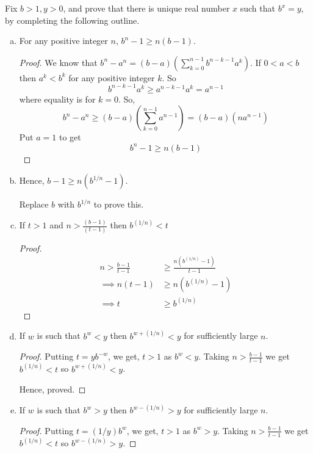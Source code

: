 \begin{prblm}
    Fix $b > 1, y > 0$, and prove that there is unique real number $x$ such that $b^x = y$, 
    by completing the following outline.
    \begin{enumerate}[(a)]
        \item For any positive integer $n$, $b^n - 1 \geq n(b-1)$.
        \begin{proof}
            We know that $b^n - a^n = (b - a)( \sum_{k=0}^{n-1} b^{n-k-1} a^k)$.
            If $0 < a < b$ then $a^k < b^k$ for any positive integer $k$. So $$b^{n-k-1}a^k \geq a^{n-k-1}a^k = a^{n-1}$$ where equality is for $k = 0$.
            So, $$ b^n - a^n \geq (b-a) \left( \sum_{k=0}^{n-1} a^{n-1} \right) = (b-a)(n a^{n-1})$$
            Put $a = 1$ to get $$ b^n - 1 \geq n(b-1) $$

        \end{proof}

        \item Hence, $b - 1 \geq n(b^{1/n} - 1)$.
        
        Replace $b$ with $b^{1/n}$ to prove this.

        \item If $t > 1$ and $n > \frac{(b-1)}{(t-1)}$ then $b^{(1/n)} < t$
        
        \begin{proof}
            \begin{align*}
                n > \frac{b-1}{t-1} & \geq \frac{n(b^{(1/n)} - 1)}{t-1} \\
                \implies n(t - 1) & \geq n(b^{(1/n)} - 1) \\
                \implies t & \geq b^{(1/n)} 
            \end{align*}
        \end{proof}

        \item If $w$ is such that $b^w < y$ then $b^{w + (1/n)} < y$ for sufficiently large $n$.
        \begin{proof}
            Putting $t = y b^{-w}$, we get, $t > 1$ as $b^w < y$. 
            Taking $n > \frac{b-1}{t-1}$ we get $b^{(1/n)} < t$ so $b^{w + (1/n)} < y$.
            
            Hence, proved.
        \end{proof}


        \item If $w$ is such that $b^w > y$ then $b^{w - (1/n)} > y$ for sufficiently large $n$.
        \begin{proof}
            Putting $t = (1/y) b^{w}$, we get, $t > 1$ as $b^w > y$. 
            Taking $n > \frac{b-1}{t-1}$ we get $b^{(1/n)} < t$ so $b^{w - (1/n)} > y$.
            

\end{proof}
\end{enumerate}
\end{prblm}
